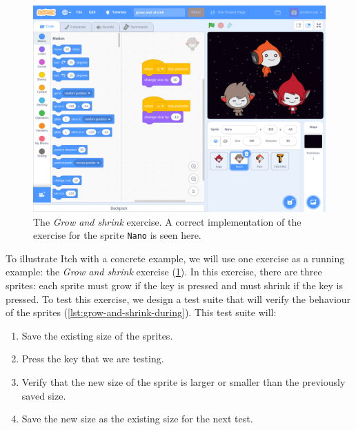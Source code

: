 \documentclass[../main]{subfiles}
\begin{document}
\begin{figure}
    \begin{wide}
        \includegraphics[width=\linewidth]{itch-grow-and-shrink-code}
    \end{wide}
    \caption{
        The \emph{Grow and shrink} exercise.
        A correct implementation of the exercise for the sprite \texttt{Nano} is seen here.
    }
    \label{fig:itch-grow-shrink-code}
\end{figure}

To illustrate Itch with a concrete example, we will use one exercise as a running example: the \emph{Grow and shrink} exercise (\cref{fig:itch-grow-shrink-code}).
In this exercise, there are three sprites: each sprite must grow if the  key is pressed and must shrink if the  key is pressed.
To test this exercise, we design a test suite that will verify the behaviour of the sprites (\cref{lst:grow-and-shrink-during}).
This test suite will:

\begin{enumerate}
    \item Save the existing size of the sprites.
    \item Press the key that we are testing.
    \item Verify that the new size of the sprite is larger or smaller than the previously saved size.
    \item Save the new size as the existing size for the next test.
\end{enumerate}
\end{document}

